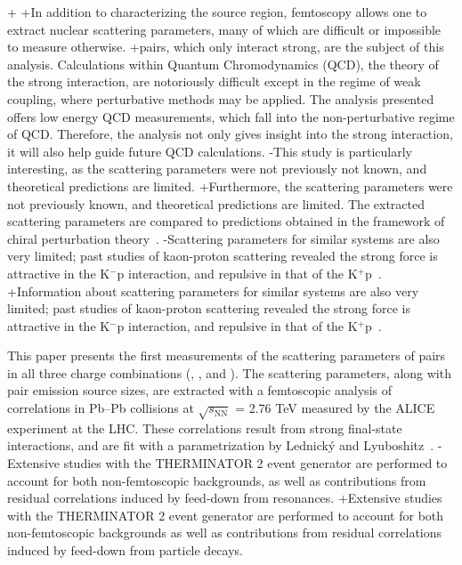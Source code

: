 {+
+In addition to characterizing the source region, femtoscopy allows one to extract nuclear scattering parameters, many of which are difficult or impossible to measure otherwise.  
+\LamK pairs, which only interact strong, are the subject of this analysis.
 Calculations within Quantum Chromodynamics (QCD), the theory of the strong interaction, are notoriously difficult except in the regime of weak coupling, where perturbative methods may be applied. 
 The \LamK analysis presented offers low energy QCD measurements, which fall into the non-perturbative regime of QCD.
 Therefore, the \LamK analysis not only gives insight into the strong interaction, it will also help guide future QCD calculations.
-This study is particularly interesting, as the \LamK scattering parameters were not previously not known, and theoretical predictions are limited.
+Furthermore, the \LamK scattering parameters were not previously known, and theoretical predictions are limited.
 The extracted scattering parameters are compared to predictions obtained in the framework of chiral perturbation theory~\cite{Liu:2006xja,Mai:2009ce}.
-Scattering parameters for similar systems are also very limited; past studies of kaon-proton scattering revealed the strong force is attractive in the K$^{-}$p interaction, and repulsive in that of the K$^{+}$p~\cite{Humphrey:1962zz, Hadjimichef:2002xe, Ikeda:2012au}.
+Information about scattering parameters for similar systems are also very limited; past studies of kaon-proton scattering revealed the strong force is attractive in the K$^{-}$p interaction, and repulsive in that of the K$^{+}$p~\cite{Humphrey:1962zz, Hadjimichef:2002xe, Ikeda:2012au}.
 
 This paper presents the first measurements of the scattering parameters of \LamK pairs in all three charge combinations (\LamKchP, \LamKchM, and \LamKs).
 The scattering parameters, along with pair emission source sizes, are extracted with a femtoscopic analysis of \LamK correlations in Pb--Pb collisions at $\sqrt{s_{\mathrm{NN}}}$ = 2.76 TeV measured by the ALICE experiment at the LHC.  
 These correlations result from strong final-state interactions, and are fit with a parametrization by Lednick\'y and Lyuboshitz~\cite{Lednicky:82}.  
-Extensive studies with the THERMINATOR 2 event generator are performed to account for both non-femtoscopic backgrounds, as well as contributions from residual correlations induced by feed-down from resonances.
+Extensive studies with the THERMINATOR 2 event generator are performed to account for both non-femtoscopic backgrounds as well as contributions from residual correlations induced by feed-down from particle decays.
 
}
